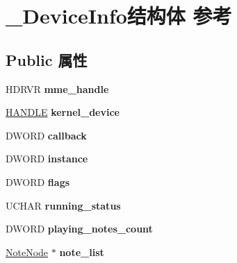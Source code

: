 \hypertarget{struct___device_info}{}\section{\+\_\+\+Device\+Info结构体 参考}
\label{struct___device_info}
\subsection*{Public 属性}
\begin{DoxyCompactItemize}
\item 
\mbox{\label{struct___device_info_a190b69852304722ccd1c08a8a80594f2}} 
H\+D\+R\+VR {\bfseries mme\+\_\+handle}
\item 
\mbox{\label{struct___device_info_aea16e1d6b7a4a5253b889006c8eb5034}} 
\hyperlink{interfacevoid}{H\+A\+N\+D\+LE} {\bfseries kernel\+\_\+device}
\item 
\mbox{\label{struct___device_info_a7a0982f7ba2cc976fda9eff97c33367b}} 
D\+W\+O\+RD {\bfseries callback}
\item 
\mbox{\label{struct___device_info_af423f50961b4efb2e34e317f31e94b6c}} 
D\+W\+O\+RD {\bfseries instance}
\item 
\mbox{\label{struct___device_info_a34cc3fb5d2d3df30d2376466584c85d1}} 
D\+W\+O\+RD {\bfseries flags}
\item 
\mbox{\label{struct___device_info_a265ed8fb832a08e74825516e3431e2dc}} 
U\+C\+H\+AR {\bfseries running\+\_\+status}
\item 
\mbox{\label{struct___device_info_a77d7ab295e80cf335b02df706b6f7f47}} 
D\+W\+O\+RD {\bfseries playing\+\_\+notes\+\_\+count}
\item 
\mbox{\label{struct___device_info_a76bfed46787b5f740e2b9b5bb2364f9f}} 
\hyperlink{struct___note_node}{Note\+Node} $\ast$ {\bfseries note\+\_\+list}
\item 
\mbox{\label{struct___device_info_a16685f9423802c34932961aed4614d52}} 

\end{DoxyCompactItemize}
